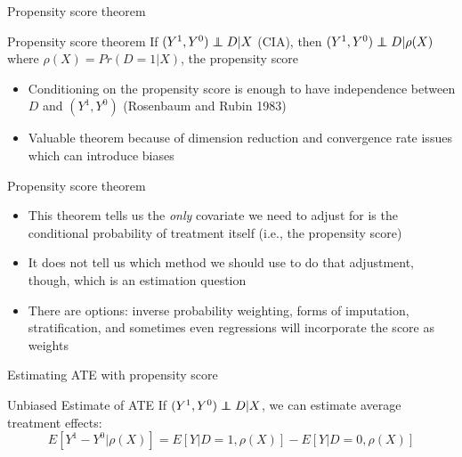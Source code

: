 \documentclass{beamer}
\newcommand\independent{\protect\mathpalette{\protect\independenT}{\perp}}
\def\independenT#1#2{\mathrel{\rlap{$#1#2$}\mkern2mu{#1#2}}}
\begin{document}
\begin{frame}{Propensity score theorem}
	
	\begin{block}{Propensity score theorem}
	If $(Y^1,Y^0)\independent{D}|X$ (CIA), then $(Y^1,Y^0)\independent{D} | \rho(X)$ where $\rho(X)=Pr(D=1|X)$, the propensity score
	\end{block}
	
	\begin{itemize}
	\item Conditioning on the propensity score is enough to have independence between $D$ and $(Y^1,Y^0)$ (Rosenbaum and Rubin 1983)
	 \item Valuable theorem because of dimension reduction and convergence rate issues which can introduce biases
	\end{itemize}
\end{frame}

\begin{frame}{Propensity score theorem}
	
	\begin{itemize}
	\item This theorem tells us the \emph{only} covariate we need to adjust for is the conditional probability of treatment itself (i.e., the propensity score)
	\item It does not tell us which method we should use to do that adjustment, though, which is an estimation question
	\item There are options: inverse probability weighting, forms of imputation, stratification, and sometimes even regressions will incorporate the score as weights
	\end{itemize}
\end{frame}



\begin{frame}{Estimating ATE with propensity score}

	\begin{block}{Unbiased Estimate of ATE}
	If $(Y^1,Y^0)\independent{D}|X$, we can estimate average treatment effects:
 $$E[Y^1-Y^0|\rho(X)] = E[Y|D=1,\rho(X)] - E[Y|D=0,\rho(X)]$$
	\end{block}


	
\end{frame}
\end{document}
